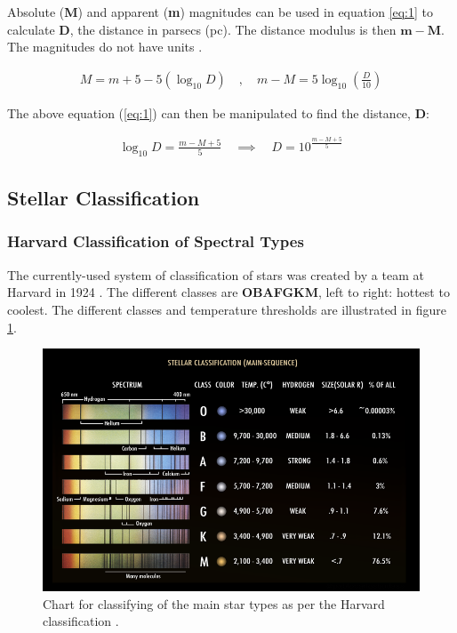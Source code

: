 \documentclass[12pt]{article}
\begin{document}
Absolute (\textbf{M}) and apparent (\textbf{m}) magnitudes can be used in equation \ref{eq:1} to calculate \textbf{D}, the distance in parsecs (pc).
The distance modulus is then $\mathbf{m - M}$.  The magnitudes do not have units
\cite{cosmosabsmag}.

\vspace{-1.5ex}
\begin{gather} \label{eq:1}
    M = m + 5 - 5 (\log_{10} D) \quad , \quad m - M = 5 \log_{10} \left( \frac{D}{10} \right)
\end{gather}

The above equation (\ref{eq:1}) can then be manipulated to find the distance, \textbf{D}:

\vspace{-1.5ex}
\begin{gather} \label{eq:2}
    \log_{10}D = \frac{m - M + 5}{5} \quad \implies \quad D = 10^{\frac{m - M + 5}{5}}
\end{gather}

\subsection{Stellar Classification}

\subsubsection{Harvard Classification of Spectral Types} \label{sec:1.2.1}

The currently-used system of classification of stars was created by a team at Harvard in 1924 \cite{harvardstar}. The different classes are \textbf{OBAFGKM}, left to right: hottest to coolest.
The different classes and temperature thresholds are illustrated in figure \ref{fig:starclassy}.

\begin{figure}[H]
    \centering
    \includegraphics[width=.9\textwidth]{Stellar_Classification_Chart.png}
    \caption{\centering Chart for classifying of the main star types as per the Harvard classification \protect\cite{wikistar}.}
    \label{fig:starclassy}
\end{figure}
\end{document}

